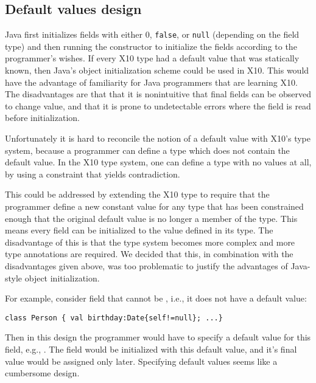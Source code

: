 

\subsection{Default values design}

Java first initializes fields with either $0$, \texttt{false}, or \texttt{null}
(depending on the field type) and then running the constructor to initialize
the fields according to the programmer's wishes.  If every X10 type had a
default value that was statically known, then Java's object initialization
scheme could be used in X10.  This would have the advantage of familiarity for
Java programmers that are learning X10.  The disadvantages are that that it is
nonintuitive that final fields can be observed to change value, and that it is
prone to undetectable errors where the field is read before initialization.

Unfortunately it is hard to reconcile the notion of a default value with X10's
type system, because a programmer can define a type which does not contain the
default value.  In the X10 type system, one can define a type with no values at
all, by using a constraint that yields contradiction.

This could be addressed by extending the X10 type to require that the
programmer define a new constant value for any type that has been constrained
enough that the original default value is no longer a member of the type.  This
means every field can be initialized to the value defined in its type.  The
disadvantage of this is that the type system becomes more complex and more type
annotations are required.  We decided that this, in combination with the
disadvantages given above, was too problematic to justify the advantages of
Java-style object initialization.

For example, consider field  that cannot be , i.e., it does not have a default value:
\vspace{-0.2cm}\begin{lstlisting}
class Person { val birthday:Date{self!=null}; ...}
\end{lstlisting}\vspace{-0.2cm}
Then in this design the programmer would have to specify a default value for this field,
    e.g., .
The field would be initialized with this default value, and it's final value would be assigned only later.
Specifying default values seems like a cumbersome design.

